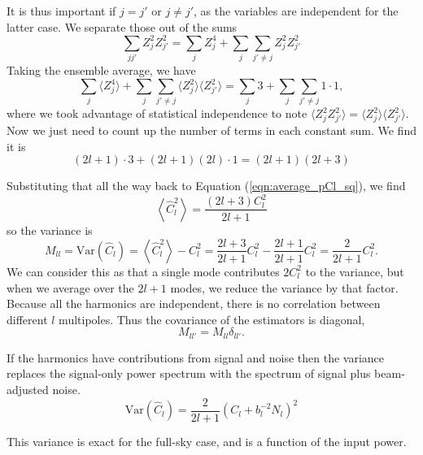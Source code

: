 It is thus important if $j=j'$ or $j \neq j'$, as the variables are independent for the latter case.  We separate those out of the sums
\begin{equation}
\sum_{jj'}  Z_j^2 Z_{j'}^2 = \sum_j Z_j^4 + \sum_j \sum_{j' \neq j} Z_j^2 Z_{j'}^2
\end{equation}
Taking the ensemble average, we have
\begin{equation}
  \sum_j  \langle Z_j^4 \rangle + \sum_j \sum_{j' \neq j} \langle Z_j^2\rangle \langle Z_{j'}^2 \rangle = \sum_j 3 + \sum_j \sum_{j' \neq j} 1 \cdot 1,
 \end{equation}
where we took advantage of statistical independence to note $\langle Z_j^2 Z_{j'}^2 \rangle=\langle Z_j^2\rangle \langle Z_{j'}^2 \rangle$.  Now we just need to count up the number of terms in each constant sum.  We find it is
\begin{equation}
 (2l+1)\cdot 3 + (2l+1)(2l) \cdot 1 = (2l + 1)(2l+3)
\end{equation}

Substituting that all the way back to Equation (\ref{eqn:average_pCl_sq}), we find 
\begin{equation}
\left\langle \hat C_l^2 \right\rangle = \frac{(2l+3) C_l^2}{2l+1}
\end{equation}
so the variance is
\begin{equation}
M_{ll} = \mathrm{Var}(\hat C_l) = \left\langle \hat C_l^2 \right\rangle - C_l^2 = \frac{2l+3}{2l+1} C_l^2 - \frac{2l+1}{2l+1} C_l^2 = \frac{2}{2l+1} C_l^2. \label{eqn:Cl_variance}
\end{equation}
We can consider this as that a single mode contributes $2 C_l^2$ to the variance, but when we average over the $2l+1$ modes, we reduce the variance by that factor.  Because all the harmonics are independent, there is no correlation between different $l$ multipoles.  Thus the covariance of the estimators is diagonal,
\begin{equation}
  M_{ll'} = M_{ll} \delta_{ll'}.
\end{equation}



If the harmonics have contributions from signal and noise then the variance replaces the signal-only power spectrum with the spectrum of signal plus beam-adjusted noise.
\begin{equation}
 \mathrm{Var}(\hat C_l) =  \frac{2}{2l+1} (C_l + b_l^{-2} N_l)^2
\end{equation}

This variance is exact for the full-sky case, and is a function of the input power.

